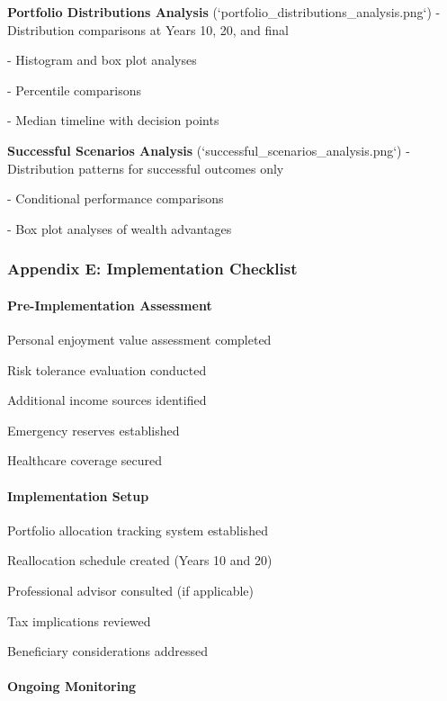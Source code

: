 \documentclass[11pt,letterpaper]{article}
\begin{document}
{{{{{{{{{{{\item \textbf{Portfolio Distributions Analysis} (`portfolio_distributions_analysis.png`)
   - Distribution comparisons at Years 10, 20, and final

   - Histogram and box plot analyses

   - Percentile comparisons

   - Median timeline with decision points


\item \textbf{Successful Scenarios Analysis} (`successful_scenarios_analysis.png`)
   - Distribution patterns for successful outcomes only

   - Conditional performance comparisons

   - Box plot analyses of wealth advantages


\subsubsection{Appendix E: Implementation Checklist}


\paragraph{Pre-Implementation Assessment}

\item [ ] Personal enjoyment value assessment completed
\item [ ] Risk tolerance evaluation conducted
\item [ ] Additional income sources identified
\item [ ] Emergency reserves established
\item [ ] Healthcare coverage secured

\paragraph{Implementation Setup}

\item [ ] Portfolio allocation tracking system established
\item [ ] Reallocation schedule created (Years 10 and 20)
\item [ ] Professional advisor consulted (if applicable)
\item [ ] Tax implications reviewed
\item [ ] Beneficiary considerations addressed

\paragraph{Ongoing Monitoring}

}}}}}}}}}}}
\end{document}

